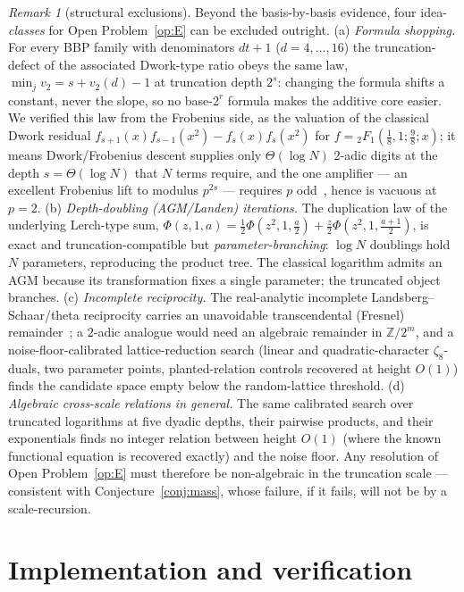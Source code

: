 \documentclass[11pt]{article}
\theoremstyle{remark}
\newtheorem{remark}[theorem]{Remark}
\theoremstyle{definition}
\newcommand{\Z}{\mathbb{Z}}
\begin{document}
\begin{remark}[structural exclusions]\label{rem:exclusions}
Beyond the basis-by-basis evidence, four idea-\emph{classes} for
Open Problem~\ref{op:E} can be excluded outright.
(a) \emph{Formula shopping.} For every BBP family with denominators
$dt+1$ ($d=4,\dots,16$) the truncation-defect of the associated Dwork-type
ratio obeys the same law, $\min_j v_2 = s + v_2(d) - 1$ at truncation depth
$2^{s}$: changing the formula shifts a constant, never the slope, so no
base-$2^{r}$ formula makes the additive core easier. We verified this law
from the Frobenius side, as the valuation of the classical Dwork residual
$f_{s+1}(x)f_{s-1}(x^{2})-f_s(x)f_s(x^{2})$ for
$f={}_2F_1(\tfrac18,1;\tfrac98;x)$; it means Dwork/Frobenius descent supplies
only $\Theta(\log N)$ $2$-adic digits at the depth $s=\Theta(\log N)$ that $N$
terms require, and the one amplifier --- an excellent Frobenius lift to modulus
$p^{2s}$ --- requires $p$ odd~\cite{BV23}, hence is vacuous at $p=2$.
(b) \emph{Depth-doubling (AGM/Landen) iterations.} The duplication law of
the underlying Lerch-type sum,
$\Phi(z,1,a)=\tfrac12\Phi(z^{2},1,\tfrac a2)+\tfrac z2\Phi(z^{2},1,\tfrac{a+1}2)$,
is exact and truncation-compatible but \emph{parameter-branching}: $\log N$
doublings hold $N$ parameters, reproducing the product tree. The classical
logarithm admits an AGM because its transformation fixes a single
parameter; the truncated object branches.
(c) \emph{Incomplete reciprocity.} The real-analytic incomplete
Landsberg--Schaar/theta reciprocity carries an unavoidable transcendental
(Fresnel) remainder~\cite{FK09}; a $2$-adic analogue would need an
algebraic remainder in $\Z/2^{m}$, and a noise-floor-calibrated
lattice-reduction search (linear and quadratic-character $\zeta_{8}$-duals,
two parameter points, planted-relation controls recovered at height $O(1)$)
finds the candidate space empty below the random-lattice threshold.
(d) \emph{Algebraic cross-scale relations in general.} The same
calibrated search over truncated logarithms at five dyadic depths,
their pairwise products, and their exponentials finds no integer relation
between height $O(1)$ (where the known functional equation is recovered
exactly) and the noise floor. Any resolution of
Open Problem~\ref{op:E} must therefore be non-algebraic in the truncation
scale --- consistent with Conjecture~\ref{conj:mass}, whose failure, if it
fails, will not be by a scale-recursion.
\end{remark}

\section{Implementation and verification}\label{sec:impl}
\end{document}

